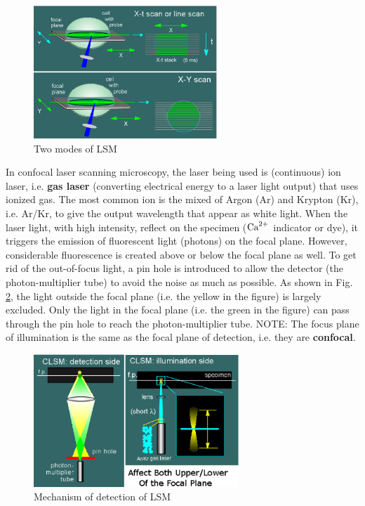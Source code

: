 \begin{figure}[hbt]
  \centerline{\includegraphics[height=5cm,
  angle=0]{./images/LSM_modes.eps}}
  \caption{Two modes of LSM}
  \label{fig:LSM_modes}
\end{figure}

In confocal laser scanning microscopy, the laser being used is (continuous) ion
laser, i.e. {\bf gas laser} (converting electrical energy to a laser light
output) that uses ionized gas. The most common ion is the mixed of Argon (Ar)
and Krypton (Kr), i.e. Ar/Kr, to give the output wavelength that appear as white
light. When the laser light, with high intensity, reflect on the specimen (${\text{Ca}^{2+}}$
indicator or dye), it triggers the emission of fluorescent light (photons) on
the focal plane. However, considerable fluorescence is created above or below
the focal plane as well. To get rid of the out-of-focus light, a pin hole is
introduced to allow the detector (the photon-multiplier tube) to avoid the noise
as much as possible. As shown in Fig. \ref{fig:LSM_detection}, the light outside
the focal plane (i.e. the yellow in the figure) is largely excluded. Only the
light in the focal plane (i.e. the green in the figure) can pass through the pin
hole to reach the photon-multiplier tube. NOTE: The focus plane of illumination
is the same as the focal plane of detection, i.e. they are {\bf confocal}.

\begin{figure}[hbt]
  \centerline{\includegraphics[height=5cm,
  angle=0]{./images/LSM_detection.eps}}
  \caption{Mechanism of detection of LSM}
  \label{fig:LSM_detection}
\end{figure}

